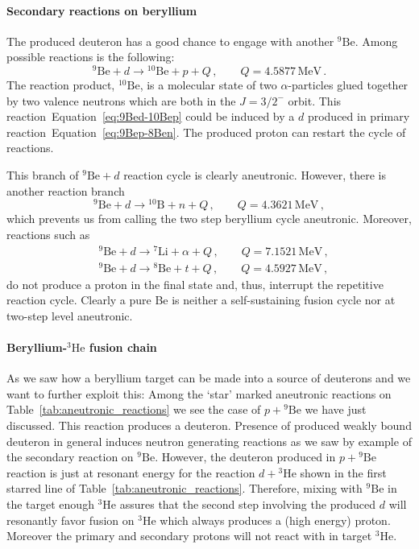 \documentclass[particles,article,accept,pdftex,moreauthors]{Definitions/mdpi}
\begin{document}
\paragraph*{\bf Secondary reactions on beryllium}
The produced deuteron has a good chance to engage with another ${}^9\mathrm{Be}$. Among possible reactions is the following:
\begin{equation}
{}^9\mathrm{Be}+d\to\! ^{10}\mathrm{Be}+p + Q \,,\qquad Q= 4.5877\,\mathrm{MeV}\,.
\label{eq:9Bed-10Bep}
\end{equation}
The reaction product, ${}^{10}\mathrm{Be}$,
is a molecular state of two $\alpha$-particles glued together by two valence neutrons which are both in the $J=3/2^-$ orbit. This reaction~Equation~\eqref{eq:9Bed-10Bep} could be induced by a $d$ produced in primary reaction~Equation~\eqref{eq:9Bep-8Ben}. The produced proton can restart the cycle of reactions. 

This branch of ${}^9\mathrm{Be}+d$ reaction cycle is clearly aneutronic. However, there is another reaction branch
\begin{equation}
{}^9\mathrm{Be}+d\to\! ^{10}\mathrm{B}+n + Q \,,\qquad Q= 4.3621\,\mathrm{MeV}\,,
\label{eq:9Bed-10Bn}
\end{equation}
which prevents us from calling the two step beryllium cycle aneutronic. Moreover, reactions such as 
\begin{align}
&{}^9\mathrm{Be}+d\to\! ^{7}\mathrm{Li}+\alpha + Q \,,\qquad Q= 7.1521\,\mathrm{MeV}\,,\\
&{}^9\mathrm{Be}+d\to\! ^{8}\mathrm{Be}+t + Q \,,\qquad Q= 4.5927\,\mathrm{MeV}\,,
\label{eq:9Bed-7Lia-8Bet}
\end{align}
do not produce a proton in the final state and, thus, interrupt the repetitive reaction cycle. Clearly a pure Be is neither a self-sustaining fusion cycle nor at two-step level aneutronic.


\paragraph*{\bf Beryllium-${}^{3}\mathrm{He}$ fusion chain}
As we saw how a beryllium target can be made into a source of deuterons and we want to further exploit this: Among the `star' marked aneutronic reactions on Table~\ref{tab:aneutronic_reactions} we see the case of $p + {}^9\mathrm{Be}$ we have just discussed. This reaction produces a deuteron. Presence of produced weakly bound deuteron in general induces neutron generating reactions as we saw by example of the secondary reaction on ${}^9\mathrm{Be}$. However, the deuteron produced in $p + {}^9\mathrm{Be}$ reaction is just at resonant energy for the reaction $d + {}^{3}\mathrm{He}$ shown in the first starred line of Table~\ref{tab:aneutronic_reactions}. Therefore, mixing with ${}^9\mathrm{Be}$ in the target enough ${}^{3}\mathrm{He}$ assures that the second step involving the produced $d$ will resonantly favor fusion on ${}^{3}\mathrm{He}$ which always produces a (high energy) proton. Moreover the primary and secondary protons will not react with in target ${}^{3}\mathrm{He}$.
\end{document}
